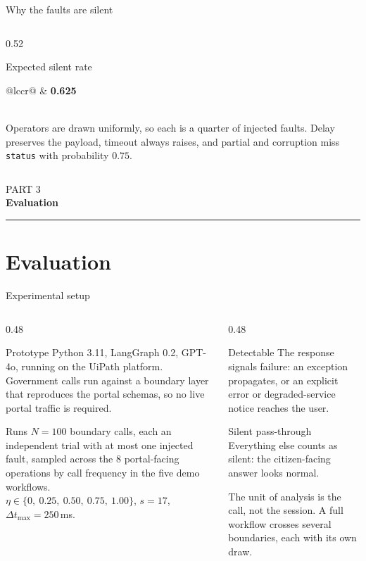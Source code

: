 \documentclass[aspectratio=169,10pt]{beamer}
\newcommand{\risk}[1]{\textcolor{rust}{\textbf{#1}}}    %
\newcommand{\cmt}[1]{{\color{stone}\small #1}}          %
\newcommand{\keypart}[2]{%
  \begin{frame}[plain, noframenumbering]
    \vfill
    \centering
    {\color{stone}\small #1}\\[0.35em]
    {\color{teal}\Large\bfseries #2}\\[0.9em]
    {\color{rust}\rule{0.25\paperwidth}{1.2pt}}
    \vfill\vfill
  \end{frame}%
}
\begin{document}
\begin{frame}{Why the faults are silent}
\begin{columns}[T]
\begin{column}{0.52\textwidth}
\begin{block}{Expected silent rate}
{\begin{tabular}{@{}lccr@{}}
          \midrule
           & \risk{0.625}\\
          \bottomrule
        \end{tabular}}
        \\[0.4em]
        {\color{stone}\scriptsize Operators are drawn uniformly, so each is a quarter of
        injected faults. Delay preserves the payload, timeout always raises, and partial and
        corruption miss \texttt{status} with probability $0.75$.}
      \end{block}
    \end{column}
  \end{columns}
\end{frame}

\keypart{PART 3}{Evaluation}
\section{Evaluation}

\begin{frame}{Experimental setup}
  \begin{columns}[T]
    \begin{column}{0.48\textwidth}
      \begin{block}{Prototype}
        \small Python 3.11, LangGraph 0.2, GPT-4o, running on the UiPath platform. Government
        calls run against a boundary layer that reproduces the portal schemas, so no live portal
        traffic is required.
      \end{block}
      \begin{block}{Runs}
        \small $N = 100$ boundary calls, each an independent trial with at most one injected
        fault, sampled across the 8 portal-facing operations by call frequency in the five
        demo workflows.\\[0.3em]
        $\eta \in \{0,\ 0.25,\ 0.50,\ 0.75,\ 1.00\}$, \quad $s = 17$, \quad
        $\Delta t_{\max} = 250$\,ms.
      \end{block}
    \end{column}
    \begin{column}{0.48\textwidth}
      \begin{block}{Detectable}
        \small The response signals failure: an exception propagates, or an explicit error or
        degraded-service notice reaches the user.
      \end{block}
      \begin{alertblock}{Silent pass-through}
        \small Everything else counts as silent: the citizen-facing answer looks normal.
      \end{alertblock}
      \medskip
      \cmt{The unit of analysis is the call, not the session. A full workflow crosses several
      boundaries, each with its own draw.}
    \end{column}
  \end{columns}
\end{frame}
\end{document}
